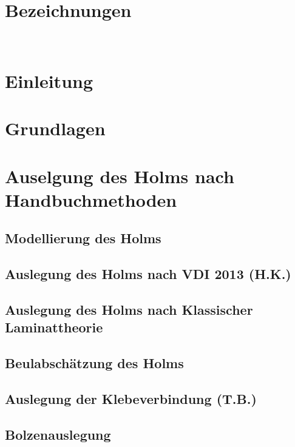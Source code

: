 \documentclass[a4paper,twoside,11pt]{article}
\begin{document}
	

\onehalfspacing
\pagestyle{empty}	


\newpage

\newpage
\pagestyle{plain}
\setcounter{page}{1}
\tableofcontents
\newpage
\section{Bezeichnungen}

\newpage ~
\newpage ~
\newpage
\section{Einleitung}

\newpage
\section{Grundlagen}

\newpage

\section{Auselgung des Holms nach Handbuchmethoden}
\subsection{Modellierung des Holms}

\newpage
\subsection{Auslegung des Holms nach VDI 2013 (H.K.)}\label{VDI}
\label{VDI2013}

\newpage
\subsection{Auslegung des Holms nach Klassischer Laminattheorie}\label{Puck}

\newpage
\subsection{Beulabschätzung des Holms}

\newpage
\subsection{Auslegung der Klebeverbindung (T.B.)}

\newpage
\subsection{Bolzenauslegung}

\newpage
\end{document}
